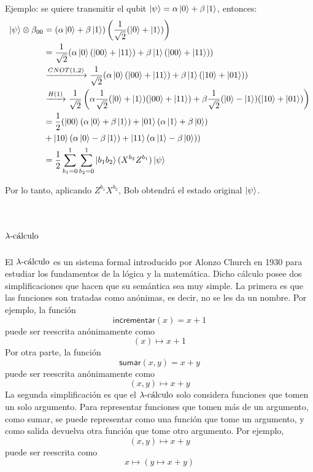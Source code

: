 Ejemplo: se quiere transmitir el qubit \( \ket{\psi} = \alpha \ket{0} + \beta \ket{1} \), entonces:
\begin{equation*}
  \begin{split}
    \ket{\psi} \tensor \beta_{00}
    & = (\alpha \ket{0} + \beta \ket{1}) \left(\frac{1}{\sqrt{2}} (\ket{0} + \ket{1}) \right) \\
    & = \frac{1}{\sqrt{2}} (\alpha \ket{0} (\ket{00} + \ket{11}) + \beta \ket{1} (\ket{00} + \ket{11})) \\
    & \xrightarrow{CNOT(1,2)} \frac{1}{\sqrt{2}} (\alpha \ket{0} (\ket{00} + \ket{11}) + \beta \ket{1} (\ket{10} + \ket{01})) \\
    & \xrightarrow{H(1)} \frac{1}{\sqrt{2}} \left( \alpha \frac{1}{\sqrt{2}} (\ket{0} + \ket{1})(\ket{00} + \ket{11}) + \beta \frac{1}{\sqrt{2}} (\ket{0} - \ket{1})(\ket{10} + \ket{01}) \right) \\
    & = \frac{1}{2} ( \ket{00} (\alpha \ket{0} + \beta \ket{1}) + \ket{01} (\alpha \ket{1} + \beta \ket{0}) \\
    & + \ket{10} (\alpha \ket{0} - \beta \ket{1}) + \ket{11} (\alpha \ket{1} - \beta \ket{0}) ) \\
    & = \frac{1}{2} \sum\limits_{b_1 = 0}^1 \sum\limits_{b_2 = 0}^1 \ket{b_1 b_2} (X^{b_2} Z^{b_1}) \ket{\psi}
  \end{split}
\end{equation*}

Por lo tanto, aplicando \( Z^{b_1} X^{b_2} \), Bob obtendrá el estado original \( \ket{\psi} \).

\section{\texorpdfstring{\( \lambdacalculus \)}{lambda calculus}}

El \( \lambdacalculus \) es un sistema formal introducido por Alonzo Church en 1930 para estudiar los fundamentos de la lógica y la matemática. Dicho cálculo posee dos simplificaciones que hacen que su semántica sea muy simple. La primera es que las funciones son tratadas como anónimas, es decir, no se les da un nombre. Por ejemplo, la función
\[ \mathsf{incrementar}(x) = x + 1 \]
puede ser reescrita anónimamente como
\[ (x) \mapsto x + 1 \]
Por otra parte, la función
\[ \mathsf{sumar}(x, y) = x + y \]
puede ser reescrita anónimamente como
\[ (x, y) \mapsto x + y \]
La segunda simplificación es que el \( \lambdacalculus \) solo considera funciones que tomen un solo argumento. Para representar funciones que tomen más de un argumento, como \textsf{sumar}, se puede representar como una función que tome un argumento, y como salida devuelva otra función que tome otro argumento. Por ejemplo,
\[ (x, y) \mapsto x + y \]
puede ser reescrita como
\[ x \mapsto (y \mapsto x + y) \]

